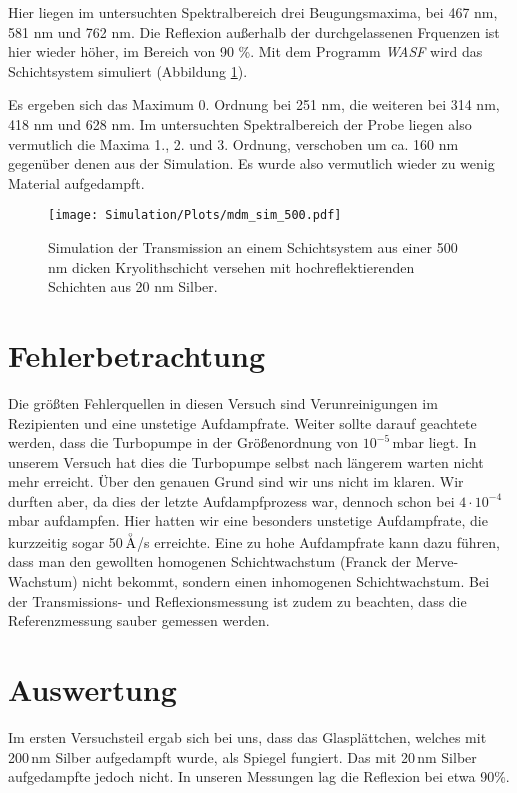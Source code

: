 \documentclass[10pt,twoside]{article}
\renewcommand{\1}{^{-1}}
\renewcommand{\2}{^{-2}}
\newcommand{\3}{^{-3}}
\newcommand{\4}{^{-4}}
\newcommand{\5}{^{-5}}
\newcommand{\6}{^{-6}}
\newcommand{\7}{^{-7}}
\newcommand{\8}{^{-8}}
\newcommand{\9}{^{-9}}
\begin{document}
Hier liegen im untersuchten Spektralbereich drei Beugungsmaxima, bei 467 nm, 581 nm und 762 nm.
Die Reflexion außerhalb der durchgelassenen Frquenzen ist hier wieder höher, im Bereich von 90 \%.
Mit dem Programm \textit{WASF} wird das Schichtsystem simuliert (Abbildung \ref{fig:mdm_500_sim}).

Es ergeben sich das Maximum 0. Ordnung bei 251 nm, die weiteren bei 314 nm, 418 nm und 628 nm.
Im untersuchten Spektralbereich der Probe liegen also vermutlich die Maxima 1., 2. und 3. Ordnung, verschoben um ca. 160 nm gegenüber denen aus der Simulation.
Es wurde also vermutlich wieder zu wenig Material aufgedampft.
\begin{figure}[h]
\centering
\texttt{[image: Simulation/Plots/mdm\_sim\_500.pdf]} 
\caption{Simulation der Transmission an einem Schichtsystem aus einer 500 nm dicken Kryolithschicht versehen mit hochreflektierenden Schichten aus 20 nm Silber.}
\label{fig:mdm_500_sim}
\end{figure}

\section{Fehlerbetrachtung}

Die größten Fehlerquellen in diesen Versuch sind Verunreinigungen im Rezipienten und eine unstetige Aufdampfrate. Weiter sollte darauf geachtete werden, 
dass die Turbopumpe in der Größenordnung von $10^{-5}$\,mbar liegt. In unserem Versuch hat dies die Turbopumpe selbst nach längerem warten nicht mehr erreicht. Über den genauen Grund sind wir uns nicht im klaren. Wir durften aber, da dies der letzte Aufdampfprozess war, dennoch schon bei $4\cdot 10^{-4}$\,mbar aufdampfen. 
Hier hatten wir eine besonders unstetige Aufdampfrate, die kurzzeitig sogar 50\,$\buildrel _{\circ} \over {\mathrm{A}}$/s erreichte. 
Eine zu hohe Aufdampfrate kann dazu führen, dass man den gewollten homogenen Schichtwachstum (Franck der Merve-Wachstum) nicht bekommt, sondern einen inhomogenen Schichtwachstum. Bei der Transmissions- und Reflexionsmessung ist zudem zu beachten, dass die Referenzmessung sauber gemessen werden.

\newpage

\section{Auswertung}

Im ersten Versuchsteil ergab sich bei uns, dass das Glasplättchen, welches mit 200\,nm Silber aufgedampft wurde, als Spiegel fungiert. Das mit 20\,nm Silber aufgedampfte jedoch nicht. In unseren Messungen lag die Reflexion bei etwa 90\%.
\end{document}
